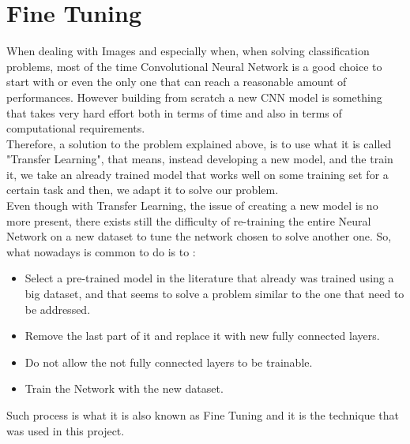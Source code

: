 
\section{Fine Tuning} 
\begin{flushleft}

When dealing with Images and especially when, when solving classification problems, most of the time Convolutional Neural Network is a good choice to start with or even the only one that can reach a reasonable amount of performances. However building from scratch a new CNN model is something that takes very hard effort both in terms of time and also in terms of computational requirements. \\
Therefore, a solution to the problem explained above, is to use what it is called "Transfer Learning", that means, instead developing a new model, and the train it, we take an already trained model that works well on some training set for a certain task and then, we adapt it to solve our problem. \\
Even though with Transfer Learning, the issue of creating a new model is no more present, there exists still the difficulty of re-training the entire Neural Network on a new dataset to tune the network chosen to solve another one. So, what nowadays is common to do is to :
\begin{itemize}
    \item Select a pre-trained model in the literature that already was trained using a big dataset, and that seems to solve a problem similar to the one that need to be addressed.
    \item Remove the last part of it and replace it with new fully connected layers.
    \item Do not allow the not fully connected layers to be trainable.
    \item Train the Network with the new dataset.
\end{itemize}

Such process is what it is also known as Fine Tuning and it is the technique that was used in this project. 
\end{flushleft}